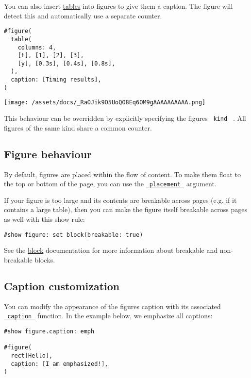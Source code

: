 You can also insert \href{/docs/reference/model/table/}{tables} into
figures to give them a caption. The figure will detect this and
automatically use a separate counter.

\begin{verbatim}
#figure(
  table(
    columns: 4,
    [t], [1], [2], [3],
    [y], [0.3s], [0.4s], [0.8s],
  ),
  caption: [Timing results],
)
\end{verbatim}

\texttt{[image: /assets/docs/\_RaOJik9O5UoQO8Eq6OM9gAAAAAAAAAA.png]}

This behaviour can be overridden by explicitly specifying the
figure\textquotesingle s \texttt{\ kind\ } . All figures of the same
kind share a common counter.

\subsection{Figure behaviour}\label{figure-behaviour}

By default, figures are placed within the flow of content. To make them
float to the top or bottom of the page, you can use the
\href{/docs/reference/model/figure/\#parameters-placement}{\texttt{\ placement\ }}
argument.

If your figure is too large and its contents are breakable across pages
(e.g. if it contains a large table), then you can make the figure itself
breakable across pages as well with this show rule:

\begin{verbatim}
#show figure: set block(breakable: true)
\end{verbatim}

See the
\href{/docs/reference/layout/block/\#parameters-breakable}{block}
documentation for more information about breakable and non-breakable
blocks.

\subsection{Caption customization}\label{caption-customization}

You can modify the appearance of the figure\textquotesingle s caption
with its associated
\href{/docs/reference/model/figure/\#definitions-caption}{\texttt{\ caption\ }}
function. In the example below, we emphasize all captions:

\begin{verbatim}
#show figure.caption: emph

#figure(
  rect[Hello],
  caption: [I am emphasized!],
)
\end{verbatim}

